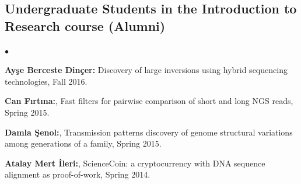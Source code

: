 \documentclass[margin,line]{res}
\newenvironment{list2}{
  \begin{list}{$\bullet$}{%
      \setlength{\itemsep}{0in}
      \setlength{\parsep}{0in} \setlength{\parskip}{0in}
      \setlength{\topsep}{0in} \setlength{\partopsep}{0in} 
      \setlength{\leftmargin}{0.2in}}}{\end{list}}
\begin{document}
\begin{resume}
\vspace*{-.6cm}
  \subsection{\small \sc Undergraduate Students in the Introduction to Research course (Alumni)}
  \begin{list2}
  \item
    {\bf Ayşe Berceste Dinçer:} Discovery of large inversions using hybrid sequencing technologies, Fall 2016.
  \item
    {\bf Can Fırtına:}, Fast filters for pairwise comparison of short and long NGS reads, Spring 2015.
  \item
    {\bf Damla Şenol:}, Transmission patterns discovery of genome structural variations among generations of a family, Spring 2015.
  \item
    {\bf Atalay Mert İleri:}, ScienceCoin: a cryptocurrency with DNA sequence alignment as proof-of-work, Spring 2014.
  \end{list2}

\vspace*{-.6cm}

\end{resume}
\end{document}
